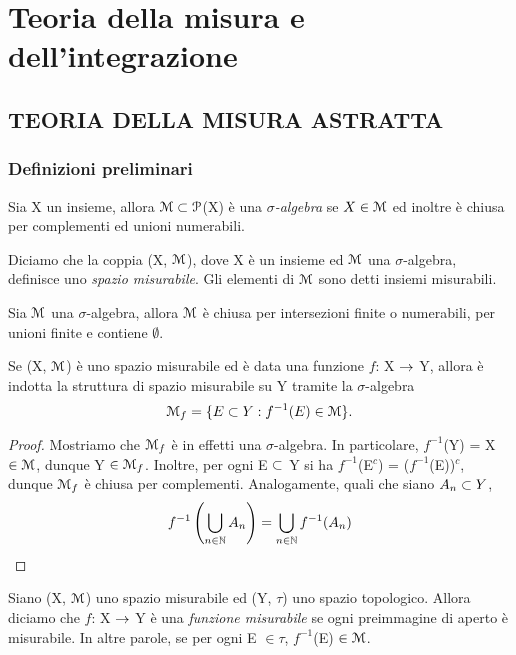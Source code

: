 \documentclass[Completo.tex]{subfiles}
\begin{document}
	\chapter{Teoria della misura e dell'integrazione}
	\section{TEORIA DELLA MISURA ASTRATTA}
	\subsection{Definizioni preliminari}
	\begin{Def}
		Sia X un insieme, allora $\eu[M] \sset \eu[P]$(X) è una \textit{$\sigma$-algebra} se $X \in \eu[M]$ ed inoltre è chiusa per complementi ed unioni numerabili.
	\end{Def}
	\begin{Def}
		Diciamo che la coppia (X, $\eu[M]$), dove X è un insieme ed $\eu[M]$ una $\sigma$-algebra, definisce uno \textit{spazio misurabile}. Gli elementi di $\eu[M]$ sono detti insiemi misurabili.
	\end{Def}
	\begin{Prop}
		Sia $\eu[M]$ una $\sigma$-algebra, allora $\eu[M]$ è chiusa per intersezioni finite o numerabili, per unioni finite e contiene $\emptyset$.
	\end{Prop}
	\begin{eTh}
		Se (X, $\eu[M]$) è uno spazio misurabile ed è data una funzione $f$: X $\rightarrow$ Y, allora è indotta la struttura di spazio misurabile su Y tramite la $\sigma$-algebra
		\begin{equation*}
		\eu[M]_f = \{E \sset Y: f^{-1}(E) \in \eu[M]\}.
		\end{equation*}
	\end{eTh}
	\begin{proof}
		Mostriamo che $\eu[M]_f$ è in effetti una $\sigma$-algebra. In particolare, $f^{-1}$(Y) = X $\in \eu[M]$, dunque Y $\in \eu[M]_f$. Inoltre, per ogni E $\subset$ Y si ha $f^{-1}$(E$^{c}$) = ($f^{-1}$(E))$^{c}$, dunque $\eu[M]_f$ è chiusa per complementi. Analogamente, quali che siano $A_n \subset Y$,
		\begin{equation*}
		f^{-1}\left(\bigcup\limits_{n \in \bb[N]}A_n\right) = \bigcup\limits_{n \in \bb[N]} f^{-1}(A_n)
		\end{equation*}
	\end{proof}
	\begin{Def}
		Siano (X, $\eu[M]$) uno spazio misurabile ed (Y, $\tau$) uno spazio topologico. Allora diciamo che $f$: X $\rightarrow$ Y è una \textit{funzione misurabile} se ogni preimmagine di aperto è misurabile. In altre parole, se per ogni E $\in \tau$, $f^{-1}$(E) $\in \eu[M]$.
	\end{Def}
\end{document}
